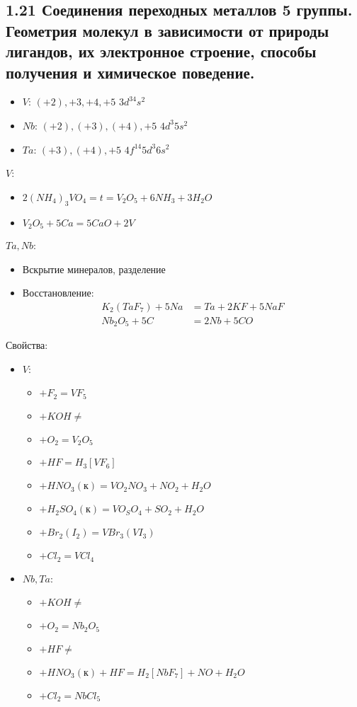 

\subsection{1.21 Соединения переходных металлов 5 группы. Геометрия молекул в зависимости от природы лигандов, их электронное строение, способы получения и химическое поведение.}
\begin{itemize}
	\item $V$: $(+2), +3, +4, +5$ \quad $3d^34s^2$
	\item $Nb$: $(+2), (+3), (+4), +5$ \quad $4d^3 5s^2$
	\item $Ta$: $(+3), (+4), +5$ \quad $4f^{14} 5d^3 6s^2$
\end{itemize}
$V$:
\begin{itemize}
	\item $2(NH_4)_3VO_4 = t = V_2O_5 + 6 NH_3 + 3 H_2O$
	\item $V_2O_5 + 5 Ca = 5CaO + 2V$
\end{itemize}
$Ta, Nb$:
\begin{itemize}
	\item Вскрытие минералов, разделение
	\item Восстановление:
	\begin{align*}
		K_2(TaF_7) + 5 Na &= Ta + 2KF + 5 NaF \\
		Nb_2O_5 + 5C &= 2Nb + 5CO
	\end{align*}
\end{itemize}
Свойства:
\begin{itemize}
	\item $V$:
	\begin{itemize}
		\item $+ F_2 = VF_5$
		\item $+ KOH \not = $
		\item $+ O_2 = V_2O_5 $
		\item $+ HF = H_3\left[VF_6 \right] $
		\item $+ HNO_3(\text{к}) = VO_2NO_3 + NO_2 + H_2O$	
		\item $+ H_2SO_4 (\text{к}) = VO_SO_4 + SO_2 + H_2O  $
		\item $+ Br_2(I_2) = VBr_3(VI_3) $
		\item $+ Cl_2 = VCl_4 $	
	\end{itemize}
	\item $Nb, Ta$:
	\begin{itemize}
		\item $+ KOH \not = $
		\item $+ O_2 = Nb_2O_5 $
		\item $+ HF \not =  $
		\item $+ HNO_3(\text{к}) + HF = H_2\left[NbF_7 \right] + NO + H_2O $	
		\item $+ Cl_2 = NbCl_5 $		
	\end{itemize}
\end{itemize}
